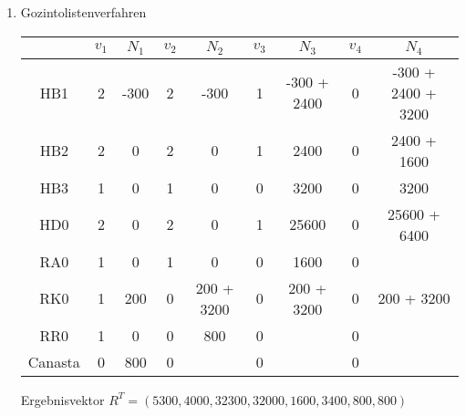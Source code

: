 \documentclass{article}
\begin{document}
\begin{enumerate}[label=(\alph*)]
\begin{center}
		\end{center}
		\item Gozintolistenverfahren
		\begin{center}
			\begin{tabular}{c|cc|cc|cc|cc}
				& $v_1$ & $N_1$ & $v_2$ & $N_2$ & $v_3$ & $N_3$ & $v_4$ & $N_4$ \\
				\hline
				HB1 & 2 & -300 & 2 & -300 & 1 & -300 + 2400 & 0 & -300 + 2400 + 3200 \\
				HB2 & 2 & 0  & 2 & 0 & 1 & 2400 & 0 & 2400 + 1600 \\
				HB3 & 1 & 0 & 1 & 0 & 0 & 3200 & 0 & 3200 \\
				HD0 & 2 & 0 & 2 & 0 & 1 & 25600 & 0 & 25600 + 6400 \\
				RA0 & 1 & 0 & 1 & 0 & 0 & 1600 & 0 & \\
				RK0 & 1 & 200 & 0 & 200 + 3200 & 0 & 200 + 3200 & 0 & 200 + 3200 \\
				RR0 & 1 & 0 & 0 & 800 & 0 & & 0 & \\
				Canasta & 0 & 800 & 0 & & 0 & & 0 &
			\end{tabular}
		\end{center}
		Ergebnisvektor $R^T=(5300,4000,32300,32000,1600,3400,800,800)$
	\end{enumerate}
	
\end{document}
